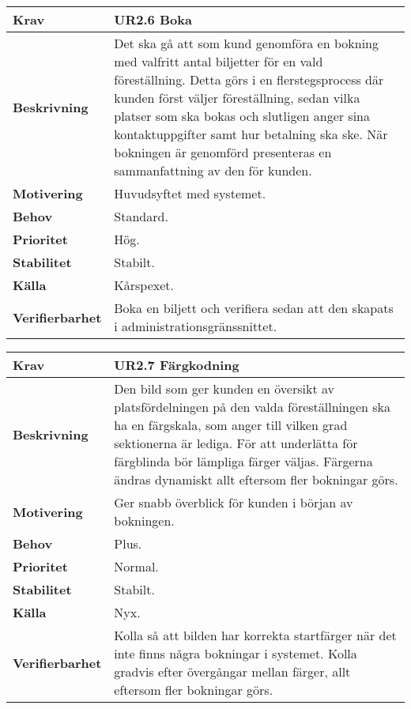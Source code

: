 \documentclass[a4paper, twoside, 11pt, titlepage]{article}
\begin{document}
		\begin {table} [ht] \begin{tabular} { p{2.6cm} p{12.5cm} }
			\hline
			{\sffamily\textbf{Krav}} & {\sffamily\textbf{UR2.6 Boka }} \\
			\hline
			{\sffamily\textbf{Beskrivning}} & {Det ska gå att som kund genomföra en bokning med valfritt antal biljetter för en vald föreställning. Detta görs i en flerstegsprocess där kunden först väljer föreställning, sedan vilka platser som ska bokas och slutligen anger sina kontaktuppgifter samt hur betalning ska ske. När bokningen är genomförd presenteras en sammanfattning av den för kunden.} \\
			\hline
			{\sffamily\textbf{Motivering}} & {Huvudsyftet med systemet.} \\
			\hline
			{\sffamily\textbf{Behov}} & {Standard.} \\
			\hline
			{\sffamily\textbf{Prioritet}} & {Hög.} \\
			\hline
			{\sffamily\textbf{Stabilitet}} & {Stabilt.} \\
			\hline
			{\sffamily\textbf{Källa}} & {Kårspexet.} \\
			\hline
			{\sffamily\textbf{Verifierbarhet}} & {Boka en biljett och verifiera sedan att den skapats i administrationsgränssnittet.} \\
			\hline
		\end{tabular} \end{table} \FloatBarrier
		\vspace{6mm}

		\begin {table} [ht] \begin{tabular} { p{2.6cm} p{12.5cm} }
			\hline
			{\sffamily\textbf{Krav}} & {\sffamily\textbf{UR2.7 Färgkodning }} \\
			\hline
			{\sffamily\textbf{Beskrivning}} & {Den bild som ger kunden en översikt av platsfördelningen på den valda föreställningen ska ha en färgskala, som anger till vilken grad sektionerna är lediga. För att underlätta för färgblinda bör lämpliga färger väljas. Färgerna ändras dynamiskt allt eftersom fler bokningar görs.} \\
			\hline
			{\sffamily\textbf{Motivering}} & {Ger snabb överblick för kunden i början av bokningen.} \\
			\hline
			{\sffamily\textbf{Behov}} & {Plus.} \\
			\hline
			{\sffamily\textbf{Prioritet}} & {Normal.} \\
			\hline
			{\sffamily\textbf{Stabilitet}} & {Stabilt.} \\
			\hline
			{\sffamily\textbf{Källa}} & {Nyx.} \\
			\hline
			{\sffamily\textbf{Verifierbarhet}} & {Kolla så att bilden har korrekta startfärger när det inte finns några bokningar i systemet. Kolla gradvis efter övergångar mellan färger, allt eftersom fler bokningar görs.} \\
			\hline
		\end{tabular} \end{table} \FloatBarrier
		\vspace{6mm}
\end{document}
